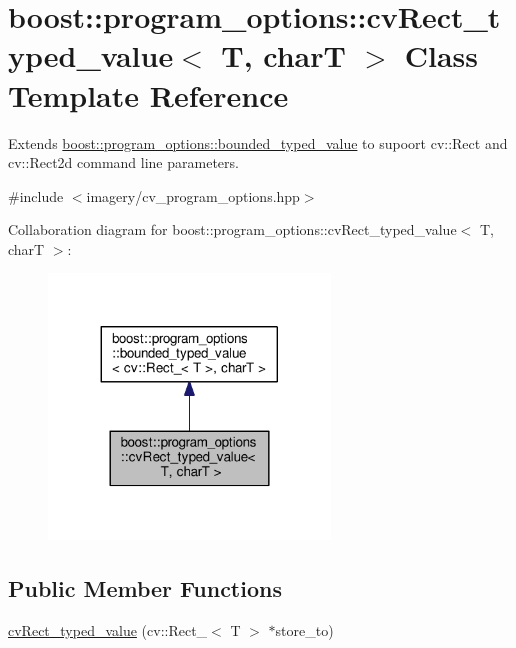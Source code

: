 \hypertarget{structboost_1_1program__options_1_1cv_rect__typed__value}{}\section{boost\+:\+:program\+\_\+options\+:\+:cv\+Rect\+\_\+typed\+\_\+value$<$ T, charT $>$ Class Template Reference}
\label{structboost_1_1program__options_1_1cv_rect__typed__value}


Extends \hyperlink{classboost_1_1program__options_1_1bounded__typed__value}{boost\+::program\+\_\+options\+::bounded\+\_\+typed\+\_\+value} to supoort cv\+::\+Rect and cv\+::\+Rect2d command line parameters.  




{\ttfamily \#include $<$imagery/cv\+\_\+program\+\_\+options.\+hpp$>$}



Collaboration diagram for boost\+:\+:program\+\_\+options\+:\+:cv\+Rect\+\_\+typed\+\_\+value$<$ T, charT $>$\+:
\nopagebreak
\begin{figure}[H]
\begin{center}
\leavevmode
\includegraphics[width=212pt]{structboost_1_1program__options_1_1cv_rect__typed__value__coll__graph}
\end{center}
\end{figure}
\subsection*{Public Member Functions}
\begin{DoxyCompactItemize}
\item 
\hyperlink{structboost_1_1program__options_1_1cv_rect__typed__value_a87ea58012c4b13b9573a11050d99613c}{cv\+Rect\+\_\+typed\+\_\+value} (cv\+::\+Rect\+\_\+$<$ T $>$ $\ast$store\+\_\+to)
\end{DoxyCompactItemize}


